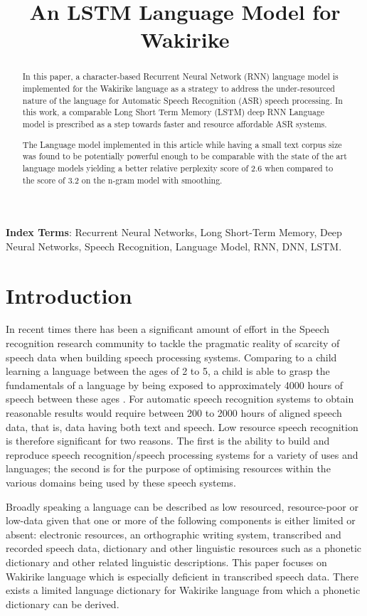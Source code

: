 \documentclass[a4paper]{article}
\title{An LSTM Language Model for Wakirike}
\begin{document}
\maketitle
% 
\begin{abstract}
In this paper, a character-based Recurrent Neural Network (RNN) language model is implemented for the Wakirike language as a strategy to address the under-resourced nature of the language for Automatic Speech Recognition (ASR) speech processing.  In this work, a comparable Long Short Term Memory (LSTM) deep RNN Language model is prescribed as a step towards faster and resource affordable ASR systems.  

The Language model implemented in this article while having a small text corpus size was found to be potentially powerful enough to be comparable with the state of the art language models yielding a better relative perplexity score of 2.6 when compared to the score of 3.2 on the n-gram model with smoothing.
\end{abstract}
\noindent\textbf{Index Terms}: Recurrent Neural Networks, Long Short-Term Memory, Deep Neural Networks, Speech Recognition, Language Model, RNN, DNN, LSTM.

\section{Introduction}

In recent times there has been a significant amount of effort in the Speech recognition research community to tackle the pragmatic reality of scarcity of speech data when building speech processing systems.  Comparing to a child learning a language between the ages of 2 to 5, a child is able to grasp the fundamentals of a language by being exposed to approximately 4000 hours of speech between these ages \cite{versteegh2015zero}.  For automatic speech recognition systems to obtain reasonable results would require between 200 to 2000 hours of aligned speech data, that is, data having both text and speech\cite{hannun2014deep}.  Low resource speech recognition is therefore significant for two reasons. The first is the ability to build and reproduce speech recognition/speech processing systems for a variety of uses and languages; the second is for the purpose of optimising resources within the various domains being used by these speech systems.

Broadly speaking a language can be described as low resourced, resource-poor or low-data \cite{besacier2014automatic} given that one or more of the following components is either limited or absent: electronic resources, an orthographic writing system, transcribed and recorded speech data, dictionary and other linguistic resources such as a phonetic dictionary and other related linguistic descriptions. This paper focuses on Wakirike language which is especially deficient in transcribed speech data.  There exists a limited language dictionary for Wakirike language from which a phonetic dictionary can be derived.
\end{document}
